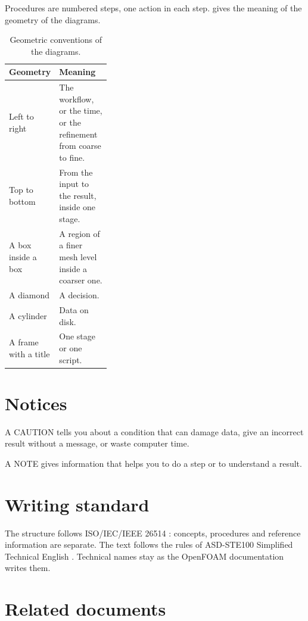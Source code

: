 \medskip
Procedures are numbered steps, one action in each step.  gives the
meaning of the geometry of the diagrams.

\begin{table}[htbp]
\centering
\caption{Geometric conventions of the diagrams.}\label{tab:diagrams}
\begin{tabularx}{\linewidth}{@{}P{0.34\linewidth} L@{}}
\toprule
Geometry & Meaning \\
\midrule
Left to right & The workflow, or the time, or the refinement from coarse to fine. \\
Top to bottom & From the input to the result, inside one stage. \\
A box inside a box & A region of a finer mesh level inside a coarser one. \\
A diamond & A decision. \\
A cylinder & Data on disk. \\
A frame with a title & One stage or one script. \\
\bottomrule
\end{tabularx}
\end{table}

\section*{Notices}

\begin{caution}
A CAUTION tells you about a condition that can damage data, give an incorrect result
without a message, or waste computer time.
\end{caution}

\begin{note}
A NOTE gives information that helps you to do a step or to understand a result.
\end{note}

\section*{Writing standard}

The structure follows ISO/IEC/IEEE 26514 \citep{iso26514}: concepts, procedures and
reference information are separate. The text follows the rules of ASD-STE100
Simplified Technical English \citep{asdste100}. Technical names stay as the OpenFOAM
documentation writes them.

\section*{Related documents}

